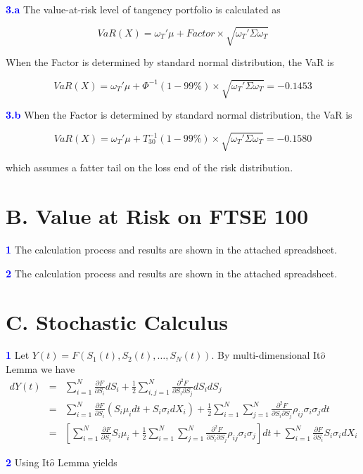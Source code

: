 \documentclass[a4paper,11pt] {article}
\begin{document}
\textcolor{blue}{\bf 3.a } The value-at-risk level of tangency portfolio is calculated as

$$
VaR(X) = \omega_T' \mu + Factor \times \sqrt{\omega_T'\Sigma\omega_T}
$$

When the Factor is determined by standard normal distribution, the VaR is

$$
VaR(X) = \omega_T' \mu + \Phi^{-1}(1-99\%) \times \sqrt{\omega_T'\Sigma\omega_T} = -0.1453
$$


\textcolor{blue}{\bf 3.b } When the Factor is determined by standard normal distribution, the VaR is

$$
VaR(X) = \omega_T' \mu + T_30^{-1}(1-99\%) \times \sqrt{\omega_T'\Sigma\omega_T} = -0.1580
$$

which assumes a fatter tail on the loss end of the risk distribution.

\section*{B. Value at Risk on FTSE 100}
\textcolor{blue}{\bf 1 } The calculation process and results are shown in the attached spreadsheet.

\textcolor{blue}{\bf 2 } The calculation process and results are shown in the attached spreadsheet.

\section*{C. Stochastic Calculus}
\textcolor{blue}{\bf 1 } Let $Y(t) = F(S_1(t), S_2(t),\ldots,S_N(t))$. By multi-dimensional It$\hat{o}$ Lemma we have
\begin{eqnarray*}
dY(t) &=& \sum_{i=1}^N \frac{\partial F}{\partial S_i} dS_i + \frac{1}{2}\sum_{i,j=1}^N \frac{\partial^2 F}{\partial S_i \partial S_j} dS_i dS_j \\
      &=& \sum_{i=1}^N \frac{\partial F}{\partial S_i}\left(S_i\mu_i dt + S_i \sigma_i dX_i\right) + \frac{1}{2}\sum_{i=1}^N\sum_{j=1}^N \frac{\partial^2 F}{\partial S_i \partial S_j} \rho_{ij} \sigma_i \sigma_j dt \\
      &=& \left[\sum_{i=1}^N \frac{\partial F}{\partial S_i}S_i\mu_i + \frac{1}{2}\sum_{i=1}^N\sum_{j=1}^N \frac{\partial^2 F}{\partial S_i \partial S_j} \rho_{ij} \sigma_i \sigma_j\right] dt  + \sum_{i=1}^N \frac{\partial F}{\partial S_i}S_i \sigma_i dX_i
\end{eqnarray*}

\textcolor{blue}{\bf 2} Using It$\hat{o}$ Lemma yields
\end{document}
